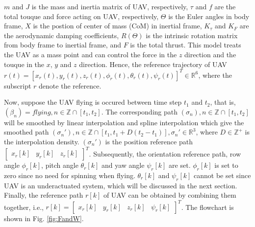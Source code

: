 \documentclass{ieeeaccess}
\begin{document}
$m$ and $J$ is the mass and inertia matrix of UAV, respectively, $\tau$ and $f$ are the total touque and force acting on UAV, respectively, $\Theta$ is the Euler angles in body frame, $X$ is the postion of center of mass (CoM) in inertial frame, $K_\tau$ and $K_F$ are the aerodynamic damping coefficients, $R(\Theta)$ is the intrinsic rotation matrix from body frame to inertial frame, and $F$ is the total thrust. This model treats the UAV as a mass point and can control the force in the $z$ direction and the touque in the $x$, $y$ and $z$ direction. Hence, the reference trajectory of UAV $r(t)=[x_r(t),y_r(t),z_r(t),\phi_r(t),\theta_r(t),\psi_r(t)]^T\in\mathbb{R}^{6}$, where the subscript $r$ denote the reference.

Now, suppose the UAV flying is occured between time step $t_1$ and $t_2$, that is, $(\beta_n)=\mathit{flying}, n\in\mathbb{Z}\cap[t_1,t_2]$. The corresponding path $(\sigma_n), n\in\mathbb{Z}\cap[t_1,t_2]$ will be smoothed by linear interpolation and spline interpolation which give the smoothed path $(\sigma_n'), n\in\mathbb{Z}\cap[t_1,t_1+D(t_2-t_1)], \sigma_n'\in\mathbb{R}^3$, where $D\in\mathbb{Z}^+$ is the interpolation density. $(\sigma_n')$ is the position reference path $\begin{bmatrix}
    x_r[k] & y_r[k] & z_r[k]
\end{bmatrix}^T$. Subsequently, the orientation reference path, row angle $\phi_r[k]$, pitch angle $\theta_r[k]$ and yaw angle $\psi_r[k]$ are set. $\phi_r[k]$ is set to zero since no need for spinning when flying. $\theta_r[k]$ and $\psi_r[k]$ cannot be set since UAV is an underactuated system, which will be discussed in the next section. Finally, the reference path $r[k]$ of UAV can be obtained by combining them together, i.e., $r[k] = \begin{bmatrix}
    x_r[k] & y_r[k] & z_r[k] & \psi_r[k]
\end{bmatrix}^T$. The flowchart is shown in Fig. \ref{fig:FandW}.

\end{document}
